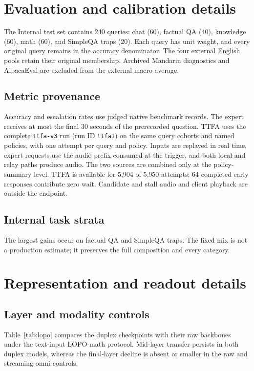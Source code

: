 \label{sec:main-end}

\section{Evaluation and calibration details}
\label{app:current-protocol}

The Internal test set contains 240 queries: chat (60), factual QA (40),
knowledge (60), math (60), and SimpleQA traps (20). Each query has unit
weight, and every original query remains in the accuracy denominator. The four
external English pools retain their original membership. Archived Mandarin
diagnostics and AlpacaEval are excluded from the external macro average.



\subsection{Metric provenance}
\label{app:metric-sources}
Accuracy and escalation rates use judged native benchmark records. The expert
receives at most the final 30 seconds of the prerecorded question. TTFA uses the
complete \texttt{ttfa-v3} run (run ID \texttt{ttfa1}) on the same query cohorts
and named policies, with one attempt per query and policy. Inputs are replayed
in real time, expert requests use the audio prefix consumed at the trigger, and
both local and relay paths produce audio. The two sources are combined only at
the policy-summary level. TTFA is available for 5,904 of 5,950 attempts; 64
completed early responses contribute zero wait. Candidate and stall audio and
client playback are outside the endpoint.

\subsection{Internal task strata}
\label{app:internal-strata}


The largest gains occur on factual QA and SimpleQA traps. The fixed mix is not a
production estimate; it preserves the full composition and every category.

\section{Representation and readout details}

\subsection{Layer and modality controls}
\label{app:signal}
Table~\ref{tab:lopo} compares the duplex checkpoints with their raw backbones
under the text-input LOPO-math protocol. Mid-layer transfer persists in both
duplex models, whereas the final-layer decline is absent or smaller in the raw
and streaming-omni controls.

